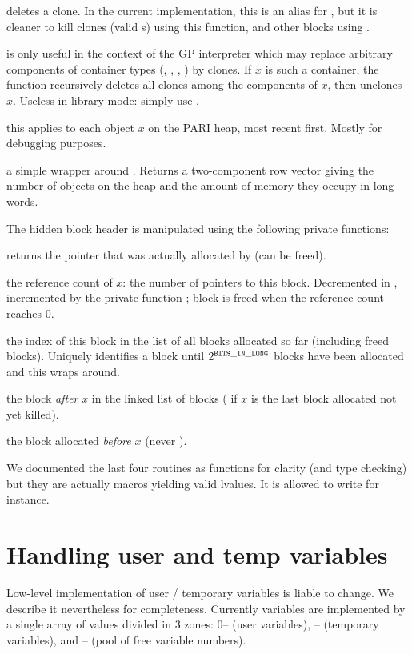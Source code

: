  deletes a clone. In the current implementation,
this is an alias for , but it is cleaner to kill clones (valid
s) using this function, and other blocks using .

 is only useful in the context of the GP
interpreter which may replace arbitrary components of container types
(, , , ) by clones. If $x$ is such
a container, the function recursively deletes all clones among the components
of $x$, then unclones $x$. Useless in library mode: simply use
.

 this applies
 to each object $x$ on the PARI heap, most recent
first. Mostly for debugging purposes.

 a simple wrapper around . Returns  a
two-component row vector giving the number of objects on the heap and the
amount of memory they occupy in long words.

 The hidden block header is manipulated using the
following private functions:

 returns the pointer that was actually allocated
by  (can be freed).

 the reference count of $x$: the number of pointers
to this block. Decremented in , incremented by the private
function ; block is freed when the reference
count reaches $0$.

 the index of this block in the list of all blocks
allocated so far (including freed blocks). Uniquely identifies a block until
$2^{\tt BITS\_IN\_LONG}$ blocks have been allocated and this wraps around.

 the block \emph{after} $x$ in the linked list of
blocks ( if $x$ is the last block allocated not yet killed).

 the block allocated \emph{before} $x$ (never
).

We documented the last four routines as functions for clarity (and type
checking) but they are actually macros yielding valid lvalues. It is allowed
to write  for instance.

\section{Handling user and temp variables}
Low-level implementation of user / temporary variables is liable to change. We
describe it nevertheless for completeness. Currently variables are
implemented by a single array of values divided in 3 zones: 0--
(user variables), -- (temporary variables),
and -- (pool of free variable numbers).


